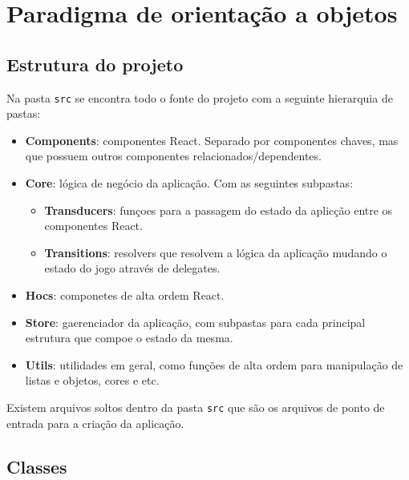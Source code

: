 \documentclass[rel_mlp]{iiufrgs}
\begin{document}
\section{Paradigma de orientação a objetos}

\subsection{Estrutura do projeto}
Na pasta \verb|src| se encontra todo o fonte do projeto com a seguinte hierarquia de pastas:
\begin{itemize}
  \item \textbf{Components}: componentes React. Separado por componentes chaves, mas que possuem outros componentes relacionados/dependentes.
  \item \textbf{Core}: lógica de negócio da aplicação. Com as seguintes subpastas:
    \begin{itemize}
      \item \textbf{Transducers}: funçoes para a passagem do estado da aplicção entre os componentes React.
      \item \textbf{Transitions}: resolvers que resolvem a lógica da aplicação mudando o estado do jogo através de delegates.
    \end{itemize}
  \item \textbf{Hocs}: componetes de alta ordem React.
  \item \textbf{Store}: gaerenciador da aplicação, com subpastas para cada principal estrutura que compoe o estado da mesma.
  \item \textbf{Utils}: utilidades em geral, como funções de alta ordem para manipulação de listas e objetos, cores e etc.
\end{itemize}

\par Existem arquivos soltos dentro da pasta \verb|src| que são os arquivos de ponto de entrada para a criação da aplicação.

\subsection{Classes}
\end{document}
